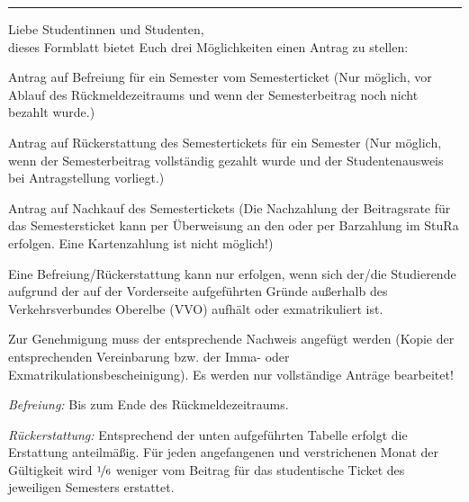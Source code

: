 \documentclass[%
	ngerman,	%
	parskip=half,
	paper=a4,%
	pagesize=auto	%
	]{scrartcl}
\begin{document}
\vfill

\hrule
Liebe Studentinnen und Studenten,\\
dieses Formblatt bietet Euch drei Möglichkeiten einen Antrag zu stellen:
\footnotesize
\begin{compactenum}
\item	Antrag auf Befreiung für ein Semester vom Semesterticket
	(Nur möglich, vor Ablauf des Rückmeldezeitraums und wenn der
	Semesterbeitrag noch nicht bezahlt wurde.)

\item	Antrag auf Rückerstattung des Semestertickets für ein
	Semester (Nur möglich, wenn der Semesterbeitrag vollständig gezahlt
	wurde und der Studentenausweis bei Antragstellung vorliegt.)

\item	Antrag auf Nachkauf des Semestertickets (Die
	Nachzahlung der Beitragsrate für das Semestersticket kann per
	Überweisung an den oder per Barzahlung im StuRa erfolgen. Eine
	Kartenzahlung ist nicht möglich!)
\end{compactenum}

Eine Befreiung/Rückerstattung kann nur erfolgen, wenn sich der/die Studierende
aufgrund der auf der Vorderseite aufgeführten Gründe außerhalb des
Verkehrsverbundes Oberelbe (VVO) aufhält oder exmatrikuliert ist.

Zur Genehmigung muss der entsprechende Nachweis angefügt werden (Kopie der
entsprechenden Vereinbarung bzw. der Imma- oder Exmatrikulationsbescheinigung).
Es werden nur vollständige Anträge bearbeitet!

\begin{compactitem}
\item[\emph{Befreiung:}]
	Bis zum Ende des Rückmeldezeitraums.
\item[\emph{Rückerstattung:}]
	Entsprechend der unten aufgeführten Tabelle erfolgt die Erstattung
	anteilmäßig. Für jeden angefangenen und verstrichenen Monat der
	Gültigkeit wird $\nicefrac{1}{6}$ weniger vom Beitrag für das
	studentische Ticket des jeweiligen Semesters erstattet.
\end{compactitem}
\end{document}
